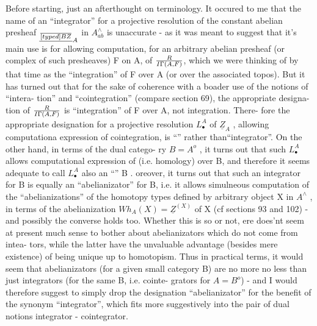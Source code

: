 Before starting, just an afterthought on terminology. It occured
to me that the name of an ``integrator'' \hand{,} for a projective resolution of
the constant abelian presheaf $\underline{\over[typed]{B}{Z}}_A$ in $A^{\wedge}_{ab}$\hand{,} is unaccurate - as it was meant
to suggest that it's main use is for allowing computation, for an
arbitrary abelian presheaf (or complex of such presheaves) F on A, of
$R\over{I}{\Gamma}(A,F)$, which we were thinking of by that time as the ``integration''
of F over A (or over the associated topos). But it has turned out that
for the sake of coherence with a boader use of the notions of ``intera-%
tion'' and ``cointegration'' (compare section 69), the appropriate designa-%
tion of $R\over{I}{\Gamma}(A,F)$ is ``\hand{\uline{\textcolor{black}{co}}}integration'' of F over A, not integration. There-%
fore the appropriate designation for a projective resolution $L^A_{\bullet}$ of $\underline{Z}_A$ ,
allowing computationa expression of cointegration, is ``\hand{\uline{\textcolor{black}{cointegrator}}}''
 rather than``integrator''. On the other hand, in terms of the dual catego-%
ry $B=A^{o}$ , it turns out that such $L^A_{\bullet}$ allows computational expression of
\hand{\uline{\textcolor{black}{integration}}} (i.e. homology) over B, and therefore it seems adequate to
call $L^A_{\bullet}$ also an ``\hand{\uline{\textcolor{black}{integrator}}}'' \hand{\uline{\textcolor{black}{for}}} B . oreover, it turns out that such
an integrator for B is equally an ``abelianizator'' for B, i.e. it allows
simulneous computation of the ``abelianizations'' of the homotopy types
defined by  arbitrary object X in $A^{\wedge}$ , in terms of the abelianization
$Wh_A(X) = \underline{Z}^{(X)}$ of X (cf sections 93 and 102) - and possibly the converse
holds too. Whether this is so or not, ere does'nt seem at present
much sense to bother about abelianizators which do not come from intea-%
tors, while the latter have the unvaluable advantage  (besides
mere existence) of being unique up to homotopism. Thus in practical
terms, it would seem that abelianizators (for a given small category B)
are no more no less than just integrators (for the same B, i.e. cointe-%
grators for $A = B^{o}$) - and I would therefore suggest to simply drop the
designation ``abelianizator'' for the benefit of the synonym ``integrator'',
which fits more suggestively into the pair of dual notions integrator -
cointegrator.

